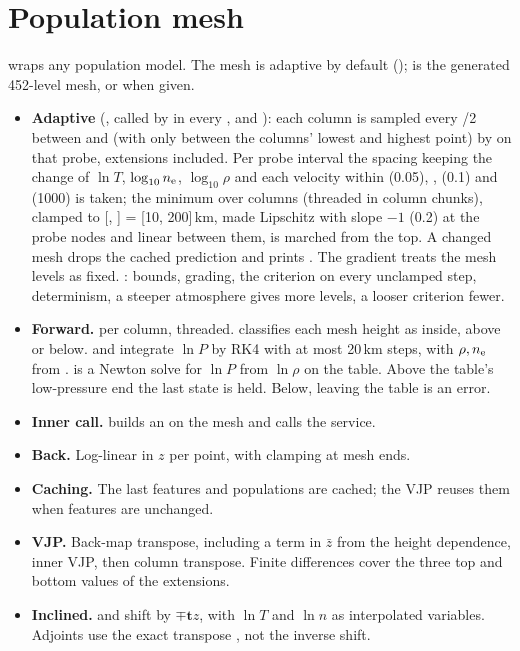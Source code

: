 \section{Population mesh}
 wraps any population model. The mesh is adaptive by default ();  is the generated 452-level mesh, or  when given.
\begin{itemize}
\item \textbf{Adaptive} (, called by  in every ,  and ): each column is sampled every /2 between  and  (with  only between the columns' lowest and highest point) by  on that probe, extensions included. Per probe interval the spacing keeping the change of $\ln T$, $\log_{10}n_{\rm e}$, $\log_{10}\rho$ and each velocity within  (0.05), ,  (0.1) and  (1000) is taken; the minimum over columns (threaded in column chunks), clamped to [, ] = [10, 200]\,km, made Lipschitz with slope  $-1$ (0.2) at the probe nodes and linear between them, is marched from the top. A changed mesh drops the cached prediction and prints . The gradient treats the mesh levels as fixed. : bounds, grading, the criterion on every unclamped step, determinism, a steeper atmosphere gives more levels, a looser criterion fewer.
\end{itemize}
\begin{itemize}
\item \textbf{Forward.}  per column, threaded.  classifies each mesh height as inside, above or below.  and  integrate $\ln P$ by RK4 with at most 20\,km steps, with $\rho,n_{\rm e}$ from .  is a Newton solve for $\ln P$ from $\ln\rho$ on the table. Above the table's low-pressure end the last state is held. Below, leaving the table is an error.
\item \textbf{Inner call.}  builds an  on the mesh and calls the service.
\item \textbf{Back.} Log-linear in $z$ per point, with  clamping at mesh ends.
\item \textbf{Caching.} The last features and populations are cached; the VJP reuses them when features are unchanged.
\item \textbf{VJP.} Back-map transpose, including a term in $\bar z$ from the height dependence, inner VJP, then column transpose. Finite differences cover the three top and bottom values of the extensions.
\item \textbf{Inclined.}  and  shift by $\mp\mathbf t z$, with $\ln T$ and $\ln n$ as interpolated variables. Adjoints use the exact transpose , not the inverse shift.
\end{itemize}
